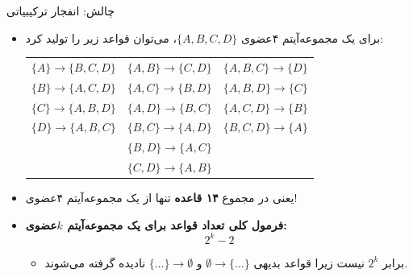 \begin{frame}{چالش: انفجار ترکیبیاتی}{}
\begin{itemize}\setlength{\itemsep}{4pt}
    \item برای یک مجموعه‌آیتم ۴عضوی $\{A, B, C, D\}$، می‌توان قواعد زیر را تولید کرد:
    \begin{center}
    \small
    \renewcommand{\arraystretch}{1.2}
    \begin{tabular}{lll}
    $\{A\} \to \{B,C,D\}$ & $\{A,B\} \to \{C,D\}$ & $\{A,B,C\} \to \{D\}$ \\
    $\{B\} \to \{A,C,D\}$ & $\{A,C\} \to \{B,D\}$ & $\{A,B,D\} \to \{C\}$ \\
    $\{C\} \to \{A,B,D\}$ & $\{A,D\} \to \{B,C\}$ & $\{A,C,D\} \to \{B\}$ \\
    $\{D\} \to \{A,B,C\}$ & $\{B,C\} \to \{A,D\}$ & $\{B,C,D\} \to \{A\}$ \\
    & $\{B,D\} \to \{A,C\}$ & \\
    & $\{C,D\} \to \{A,B\}$ & \\
    \end{tabular}
    \end{center}
    \item یعنی در مجموع \textbf{۱۴ قاعده} تنها از یک مجموعه‌آیتم ۴عضوی!
    \item \textbf{فرمول کلی تعداد قواعد برای یک مجموعه‌آیتم $k$‌عضوی:}
    \[
    2^k - 2
    \]
    \begin{itemize}\footnotesize
        \item برابر $2^k$ نیست زیرا قواعد بدیهی $\emptyset \to \{\dots\}$ و $\{\dots\} \to \emptyset$ نادیده گرفته می‌شوند.
    \end{itemize}
\end{itemize}
\end{frame}

